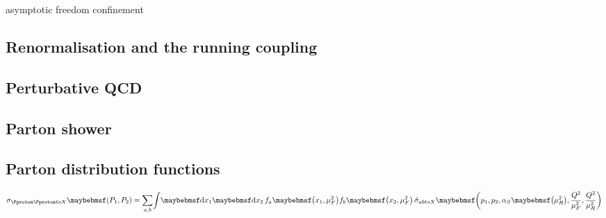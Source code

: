 
\cite{Ellis:1996}

asymptotic freedom
confinement

\subsection{Renormalisation and the running coupling}
\label{sec:qcd:renormalisation}

\subsection{Perturbative QCD}
\label{sec:qcd:pqcd}

\subsection{Parton shower}
\label{sec:qcd:ps}

\subsection{Parton distribution functions}
\label{sec:qcd:pdf}

\begin{equation}
	\sigma_{\HepProcess{\Pproton \Pproton \HepTo X}}\parenths{P_1, P_2} = 
	\sum\limits_{a, b} \! \int \! \d{x_1} \d{x_2} \,
	f_a \parenths{x_1, \mu_F^2} f_b \parenths{x_2, \mu_F^2} \,
	\hat{\sigma}_{\HepProcess{ab \HepTo X}} \parenths{p_1, p_2, \alphaS\parenths{\mu_R^2}, \frac{Q^2}{\mu_F^2}, \frac{Q^2}{\mu_R^2}} 
\end{equation}
